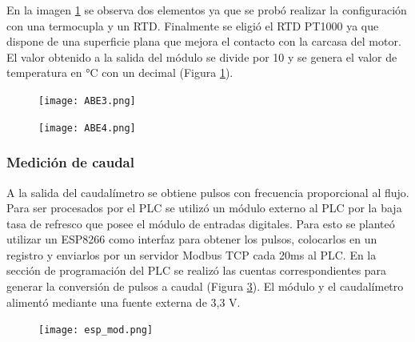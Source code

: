 En la imagen \ref{fig:ABE3} se observa dos elementos ya que se probó realizar la configuración con una termocupla y un RTD. Finalmente se eligió el RTD PT1000 ya que dispone de una superficie plana que mejora el contacto con la carcasa del motor. El valor obtenido a la salida del módulo se divide por 10 y se genera el valor de temperatura en °C con un decimal  (Figura \ref{fig:ABE3}).

\begin{figure}[H]
	\centering
	\texttt{[image: ABE3.png]}
	\label{fig:ABE3}
\end{figure}

\begin{figure}[H]
	\centering
	\texttt{[image: ABE4.png]}
	\label{fig:ABE4}
\end{figure}

\subsubsection{Medición de caudal}
A la salida del caudalímetro se obtiene pulsos con frecuencia proporcional al flujo. Para ser procesados por el PLC se utilizó un módulo externo al PLC por la baja tasa de refresco que posee el módulo de entradas digitales. Para esto se planteó utilizar un ESP8266 como interfaz para obtener los pulsos, colocarlos en un registro y enviarlos por un servidor Modbus TCP cada 20ms al PLC. En la sección de programación del PLC se realizó las cuentas correspondientes para generar la conversión de pulsos a caudal (Figura \ref{fig:modtcp}). El módulo y el caudalímetro alimentó mediante una fuente externa de 3,3 V.
\begin{figure}[htbp]
	\centering
	\texttt{[image: esp\_mod.png]}
	\label{fig:modtcp}
\end{figure}
\newpage

